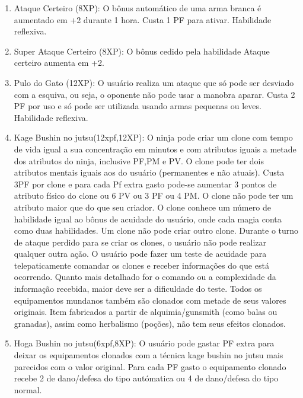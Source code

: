\begin{enumerate}
	\item Ataque Certeiro (8XP): O bônus automático de uma arma branca é aumentado em +2 durante 1 hora. Custa 1 PF para ativar. Habilidade reflexiva.
	
	\item Super Ataque Certeiro (8XP): O bônus cedido pela habilidade Ataque certeiro aumenta em +2. 
	
	\item Pulo do Gato (12XP): O usuário realiza um ataque que só pode ser desviado com a esquiva, ou seja, o oponente não pode usar a manobra aparar. Custa 2 PF por uso e só pode ser utilizada usando armas pequenas ou leves. Habilidade reflexiva.


	\item Kage Bushin no jutsu(12xpf,12XP): O ninja pode criar um clone com tempo de vida igual a sua concentração em minutos e com atributos iguais a metade dos atributos do ninja, inclusive PF,PM e PV. O clone pode ter dois atributos mentais iguais aos do usuário (permanentes e não atuais). Custa 3PF por clone e para cada Pf extra gasto pode-se aumentar 3 pontos de atributo físico do clone ou 6 PV ou 3 PF ou 4 PM. O clone não pode ter um atributo maior que do que seu criador. O clone conhece um número de habilidade igual ao bônus de acuidade do usuário, onde cada magia conta como duas habilidades. Um clone não pode criar outro clone. Durante o turno de ataque perdido para se criar os clones, o usuário não pode realizar qualquer outra ação. O usuário pode fazer um teste de acuidade para telepaticamente comandar os clones e receber informações do que está ocorrendo. Quanto mais detalhado for o comando ou a complexidade da informação recebida, maior deve ser a dificuldade do teste. Todos os equipamentos mundanos também são clonados com metade de seus valores originais. Item fabricados a partir de alquimia/gunsmith (como balas ou granadas), assim como herbalismo (poções), não tem seus efeitos clonados.
	
	\item Hoga Bushin no jutsu(6xpf,8XP): O usuário pode gastar PF extra para deixar os equipamentos clonados com a técnica kage bushin no jutsu mais parecidos com o valor original. Para cada PF gasto o equipamento clonado recebe 2 de dano/defesa do tipo autómatica ou 4 de dano/defesa do tipo normal.	
	

\end{enumerate}
